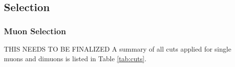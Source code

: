 \documentclass[12pt]{article}
\newcommand{\jpsi}{$J/\Psi$ }
\begin{document}



\subsection{Selection}

\subsubsection{Muon Selection}
\label{sec:selection}

{\color{red} THIS NEEDS TO BE FINALIZED}
A summary of all cuts applied for single muons and dimuons is listed in Table \ref{tab:cuts}.
\end{document}
